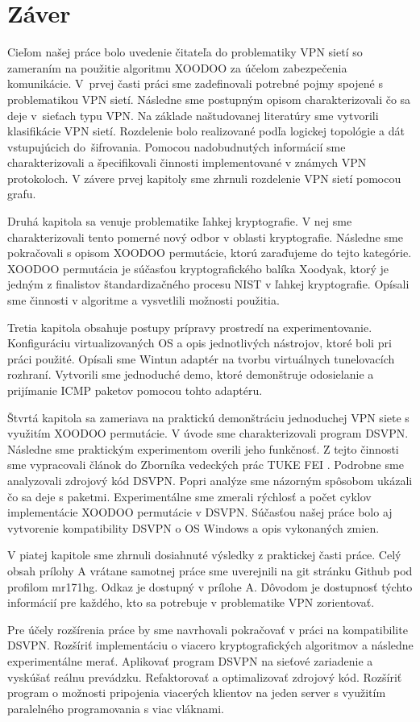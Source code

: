 
\chapter{Záver}
\label{summary}
Cieľom našej práce bolo uvedenie čitateľa do problematiky VPN sietí so zameraním na použitie algoritmu XOODOO za účelom zabezpečenia komunikácie. V~prvej časti práci sme zadefinovali potrebné pojmy spojené s problematikou VPN sietí. Následne sme postupným opisom charakterizovali čo sa deje v~sieťach typu VPN. Na základe naštudovanej literatúry sme vytvorili klasifikácie VPN sietí. Rozdelenie bolo realizované podľa logickej topológie a dát vstupujúcich do~šifrovania. Pomocou nadobudnutých informácií sme charakterizovali a špecifikovali činnosti implementované v známych VPN protokoloch. V závere prvej kapitoly sme zhrnuli rozdelenie VPN sietí pomocou grafu.

Druhá kapitola sa venuje problematike ľahkej kryptografie. V nej sme charakterizovali tento pomerné nový odbor v oblasti kryptografie. Následne sme pokračovali s opisom XOODOO permutácie, ktorú zaraďujeme do tejto kategórie. XOODOO permutácia je súčasťou kryptografického balíka Xoodyak, ktorý je jedným z finalistov štandardizačného procesu NIST v ľahkej kryptografie. Opísali sme činnosti v algoritme a vysvetlili možnosti použitia. 

Tretia kapitola obsahuje postupy prípravy prostredí na experimentovanie. Konfiguráciu virtualizovaných OS a opis jednotlivých nástrojov, ktoré boli pri práci použité. Opísali sme Wintun adaptér na tvorbu virtuálnych tunelovacích rozhraní. Vytvorili sme jednoduché demo, ktoré demonštruje odosielanie a prijímanie ICMP paketov pomocou tohto adaptéru.

Štvrtá kapitola sa zameriava na praktickú demonštráciu jednoduchej VPN siete s využitím XOODOO permutácie. V úvode sme charakterizovali program DSVPN. Následne sme praktickým experimentom overili jeho funkčnosť. Z tejto činnosti sme vypracovali článok do Zborníka vedeckých prác TUKE FEI \cite{clanok}. Podrobne sme analyzovali zdrojový kód DSVPN. Popri analýze sme názorným spôsobom ukázali čo sa deje s paketmi. Experimentálne sme zmerali rýchlosť a počet cyklov implementácie XOODOO permutácie v DSVPN. Súčasťou našej práce bolo aj vytvorenie kompatibility DSVPN o OS Windows a opis vykonaných zmien. 

V piatej kapitole sme zhrnuli dosiahnuté výsledky z praktickej časti práce. Celý obsah prílohy A vrátane samotnej práce sme uverejnili na git stránku Github pod profilom mr171hg. Odkaz je dostupný v prílohe A. Dôvodom je dostupnosť týchto informácií pre každého, kto sa potrebuje v problematike VPN zorientovať.  

Pre účely rozšírenia práce by sme navrhovali pokračovať v práci na kompatibilite DSVPN. Rozšíriť implementáciu o viacero kryptografických algoritmov a následne experimentálne merať. Aplikovať program DSVPN na sieťové zariadenie a vyskúšať reálnu prevádzku. Refaktorovať a optimalizovať zdrojový kód. Rozšíriť program o možnosti pripojenia viacerých klientov na jeden server s využitím paralelného programovania s viac vláknami. 
